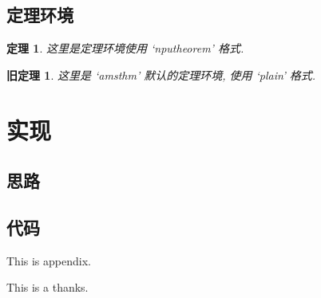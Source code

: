 \documentclass[twoside,UTF8,phd]{nputhesis}
\newtheorem{thm}{定理}[section]
\theoremstyle{plain}
\newtheorem{oldthm}{旧定理}[section]
\begin{document}
\section{定理环境}
\lipsum[1]
\begin{thm}
    这里是定理环境使用 `nputheorem' 格式.
\end{thm}
\lipsum[2]
\begin{oldthm}
    这里是 `amsthm' 默认的定理环境, 使用 `plain' 格式.
\end{oldthm}
\lipsum[3]

\chapter{实现}
\section{思路}
\section{代码}


\backmatter



\Appendix
This is appendix.

\Thanks
This is a thanks.

\Work

\statement
\end{document}
